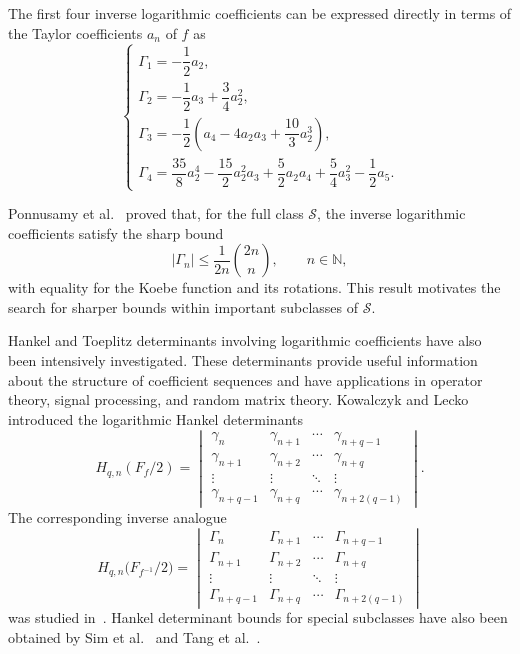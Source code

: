 \documentclass[11pt,reqno]{amsart}
\numberwithin{equation}{section}
\begin{document}
The first four inverse logarithmic coefficients can be expressed directly in terms of the Taylor coefficients $a_n$ of $f$ as
\begin{equation}\label{IG1}
\begin{cases}
\Gamma_1=-\dfrac{1}{2}a_2,\\[8pt]
\Gamma_2=-\dfrac{1}{2}a_3+\dfrac{3}{4}a_2^2,\\[8pt]
\Gamma_3=-\dfrac{1}{2}\left(a_4-4a_2a_3+\dfrac{10}{3}a_2^3\right),\\[8pt]
\Gamma_4=\dfrac{35}{8}a_2^4-\dfrac{15}{2}a_2^2a_3+\dfrac{5}{2}a_2a_4+\dfrac{5}{4}a_3^2-\dfrac{1}{2}a_5.
\end{cases}
\end{equation}

Ponnusamy et al.\ \cite{Ponnusamy2018} proved that, for the full class $\mathcal{S}$, the inverse logarithmic coefficients satisfy the sharp bound
\[
|\Gamma_n|
\le
\frac{1}{2n}\binom{2n}{n},\qquad n\in\mathbb{N},
\]
with equality for the Koebe function and its rotations. This result motivates the search for sharper bounds within important subclasses of $\mathcal{S}$.

Hankel and Toeplitz determinants involving logarithmic coefficients have also been intensively investigated. These determinants provide useful information about the structure of coefficient sequences and have applications in operator theory, signal processing, and random matrix theory. Kowalczyk and Lecko~\cite{12,15} introduced the logarithmic Hankel determinants
\[
H_{q,n}\left(F_f/2\right)
=
\begin{vmatrix}
\gamma_n & \gamma_{n+1} & \cdots & \gamma_{n+q-1}\\
\gamma_{n+1} & \gamma_{n+2} & \cdots & \gamma_{n+q}\\
\vdots & \vdots & \ddots & \vdots\\
\gamma_{n+q-1} & \gamma_{n+q} & \cdots & \gamma_{n+2(q-1)}
\end{vmatrix}.
\]
The corresponding inverse analogue
\[
H_{q,n}\bigl(F_{f^{-1}}/2\bigr)
=
\begin{vmatrix}
\Gamma_n & \Gamma_{n+1} & \cdots & \Gamma_{n+q-1}\\
\Gamma_{n+1} & \Gamma_{n+2} & \cdots & \Gamma_{n+q}\\
\vdots & \vdots & \ddots & \vdots\\
\Gamma_{n+q-1} & \Gamma_{n+q} & \cdots & \Gamma_{n+2(q-1)}
\end{vmatrix}
\]
was studied in~\cite{10,16}. Hankel determinant bounds for special subclasses have also been obtained by Sim et al.\ \cite{STZ} and Tang et al.\ \cite{TAA,TAH}.
\end{document}
